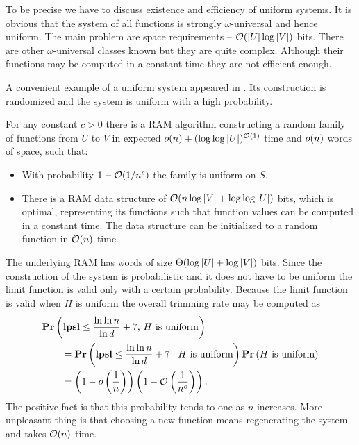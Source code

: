 To be precise we have to discuss existence and efficiency of uniform systems. It is obvious that the system of all functions is strongly $\omega$-universal and hence uniform. The main problem are space requirements -- $\mathcal{O}(|U| \log |V|)$ bits. There are other $\omega$-universal classes known but they are quite complex. Although their functions may be computed in a constant time they are not efficient enough. 

A convenient example of a uniform system appeared in \cite{DBLP:journals/siamcomp/PaghP08}. Its construction is randomized and the system is uniform with a high probability.
\begin{theorem}
\label{theorem-uniform-system}
For any constant $c > 0$ there is a RAM algorithm constructing a random family of functions from $U$ to $V$ in expected $o(n) + (\log \log|U|)^{\mathcal{O}(1)}$ time and $o(n)$ words of space, such that:
\begin{itemize}
\item With probability $1 - \mathcal{O}(1 / n^c)$ the family is uniform on $S$.
\item There is a RAM data structure of $\mathcal{O}(n \log|V| + \log \log|U|)$ bits, which is optimal, representing its functions such that function values can be computed in a constant time. The data structure can be initialized to a random function in $\mathcal{O}(n)$ time.
\end{itemize}
\end{theorem}

The underlying RAM has words of size $\mathrm{\Theta}(\log |U| + \log |V|)$ bits. Since the construction of the system is probabilistic and it does not have to be uniform the limit function is valid only with a certain probability. Because the limit function is valid when $H$ is uniform the overall trimming rate may be computed as
\[
\begin{split} 
& \mathbf{Pr}\left(\mathbf{lpsl} \leq \frac{\ln \ln n}{\ln d} + 7,\, H \mbox{ is uniform}\right) \\
	& \qquad = \mathbf{Pr}\left(\mathbf{lpsl} \leq \frac{\ln \ln n}{\ln d} + 7 \mid H \mbox{ is uniform}\right) \mathbf{Pr}\left(H \mbox{ is uniform}\right) \\ 
	& \qquad = \left(1 - o\left(\frac{1}{n}\right)\right)\left(1 - \mathcal{O}\left(\frac{1}{n^c}\right)\right). \\
\end{split}
\]
The positive fact is that this probability tends to one as $n$ increases. More unpleasant thing is that choosing a new function means regenerating the system and takes $\mathcal{O}(n)$ time.

